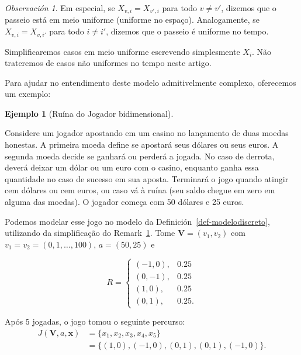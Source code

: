 \documentclass[
  spanish,
  12pt,
]{article}
\theoremstyle{definition}
\newtheorem{example}{Ejemplo}[section]
\theoremstyle{definition}
\theoremstyle{remark}
\newtheorem{refremark}{Observación}[section]
\begin{document}
\begin{refremark}
Em especial, se \(X_{v, i} = X_{v', i}\) para todo \(v \neq v'\),
dizemos que o passeio está em meio uniforme (uniforme no espaço).
Analogamente, se \(X_{v, i} = X_{v, i'}\) para todo \(i \neq i'\),
dizemos que o passeio é uniforme no tempo.

Simplificaremos casos em meio uniforme escrevendo simplesmente
\(X_{i}\). Não trateremos de casos não uniformes no tempo neste artigo.

\label{rem-uniforme}

\end{refremark}

Para ajudar no entendimento deste modelo admitivelmente complexo,
oferecemos um exemplo:

\begin{example}[Ruína do Jogador
bidimensional]\protect\hypertarget{exm-modelodiscreto}{}\label{exm-modelodiscreto}

Considere um jogador apostando em um casino no lançamento de duas moedas
honestas. A primeira moeda define se apostará seus dólares ou seus
euros. A segunda moeda decide se ganhará ou perderá a jogada. No caso de
derrota, deverá deixar um dólar ou um euro com o casino, enquanto ganha
essa quantidade no caso de sucesso em sua aposta. Terminará o jogo
quando atingir cem dólares ou cem euros, ou caso vá à ruína (seu saldo
chegue em zero em alguma das moedas). O jogador começa com 50 dólares e
25 euros.

Podemos modelar esse jogo no modelo da
Definición~\ref{def-modelodiscreto}, utilizando da simplificação do
Remark~\ref{rem-uniforme}. Tome \(\pmb{V} = (v_1, v_2)\) com
\(v_1 = v_2 = (0, 1, \dots, 100)\), \(a = (50, 25)\) e

\[
R = \begin{cases}
(-1, 0), & 0.25 \\
(0, -1), & 0.25 \\
(1, 0), & 0.25 \\
(0, 1), & 0.25.
\end{cases}
\]

Após \(5\) jogadas, o jogo tomou o seguinte percurso: \[
\begin{aligned}
J(\pmb{V}, a, \pmb{x}) &= \{x_1, x_2, x_3, x_4, x_5\} \\
&= \{(1,0), (-1, 0), (0, 1), (0, 1), (-1, 0)\}.
\end{aligned}
\]

\end{example}
\end{document}
